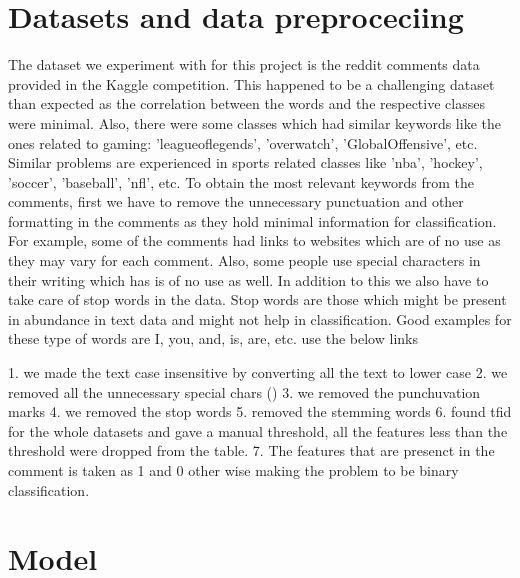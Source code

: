 \documentclass[conference]{IEEEtran}
\begin{document}
\section{Datasets and data preproceciing }
The dataset we experiment with for this project is the reddit comments data provided in the Kaggle competition. This happened to be a challenging dataset than expected as the correlation between the words and the respective classes were minimal. Also, there were some classes which had similar keywords like the ones related to gaming: 'leagueoflegends', 'overwatch', 'GlobalOffensive', etc. Similar problems are experienced in sports related classes like 'nba', 'hockey', 'soccer', 'baseball', 'nfl', etc. To obtain the most relevant keywords from the comments, first we have to remove the unnecessary punctuation and other formatting in the comments as they hold minimal information for classification. For example, some of the comments had links to websites which are of no use as they may vary for each comment. Also, some people use special characters in their writing which has  is of no use as well. In addition to this we also have to take care of stop words in the data. Stop words are those which might be present in abundance in text data and might not help in classification. Good examples for these type of words are I, you, and, is, are, etc.
use the below links 

1. we made the text case insensitive by converting all the text to lower case
2. we removed all the unnecessary special chars ()
3. we removed the punchuvation marks
4. we removed the stop words
5. removed the stemming words
6. found tfid for the whole datasets and gave a manual threshold, all the features less than the threshold were dropped from the table.
7. The features that are presenct in the comment is taken as 1 and 0 other wise making the problem to be binary classification.

\section{Model}
\end{document}
